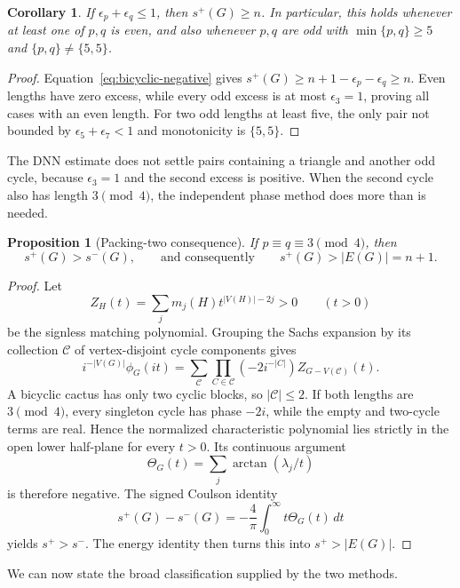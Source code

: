 \documentclass[11pt]{article}
\newtheorem{proposition}[theorem]{Proposition}
\newtheorem{corollary}[theorem]{Corollary}
\theoremstyle{remark}
\begin{document}
\begin{corollary}\label{cor:dnn-bicyclic}
If $\epsilon_p+\epsilon_q\leq1$, then $s^+(G)\geq n$.  In particular, this
holds whenever at least one of $p,q$ is even, and also whenever $p,q$ are odd
with $\min\{p,q\}\geq5$ and $\{p,q\}\ne\{5,5\}$.
\end{corollary}

\begin{proof}
Equation~\eqref{eq:bicyclic-negative} gives
$s^+(G)\geq n+1-\epsilon_p-\epsilon_q\geq n$.  Even lengths have zero
excess, while every odd excess is at most $\epsilon_3=1$, proving all cases
with an even length.  For two odd lengths at least five, the only pair not
bounded by $\epsilon_5+\epsilon_7<1$ and monotonicity is $\{5,5\}$.
\end{proof}

The DNN estimate does not settle pairs containing a triangle and another odd
cycle, because $\epsilon_3=1$ and the second excess is positive.  When the
second cycle also has length $3\pmod4$, the independent phase method does
more than is needed.

\begin{proposition}[Packing-two consequence]
\label{prop:packing}
If $p\equiv q\equiv3\pmod4$, then
\[
 s^+(G)>s^-(G),
 \qquad\text{and consequently}\qquad
 s^+(G)>|E(G)|=n+1.
\]
\end{proposition}

\begin{proof}
 Let
 \[
  Z_H(t)=\sum_jm_j(H)t^{|V(H)|-2j}>0\qquad(t>0)
 \]
 be the signless matching polynomial.  Grouping the Sachs expansion by its
 collection $\mathcal C$ of vertex-disjoint cycle components gives
 \[
  i^{-|V(G)|}\phi_G(it)
  =\sum_{\mathcal C}
   \prod_{C\in\mathcal C}(-2i^{-|C|})
   Z_{G-V(\mathcal C)}(t).
 \]
 A bicyclic cactus has only two cyclic blocks, so $|\mathcal C|\leq2$.  If
 both lengths are $3\pmod4$, every singleton cycle has phase $-2i$, while
 the empty and two-cycle terms are real.  Hence the normalized characteristic
 polynomial lies strictly in the open lower half-plane for every $t>0$.
 Its continuous argument
 \[
  \Theta_G(t)=\sum_j\arctan(\lambda_j/t)
 \]
 is therefore negative.  The signed Coulson identity
 \[
  s^+(G)-s^-(G)=-\frac4\pi\int_0^\infty t\Theta_G(t)\,dt
 \]
 yields $s^+>s^-$.  The energy identity then turns this into
 $s^+>|E(G)|$.
\end{proof}

We can now state the broad classification supplied by the two methods.
\end{document}
